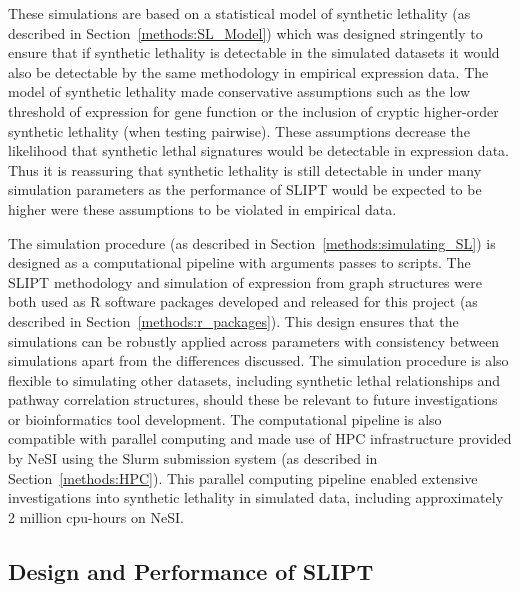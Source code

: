 These simulations are based on a statistical model of synthetic lethality (as described in Section~\ref{methods:SL_Model}) which was designed stringently to ensure that if synthetic lethality is detectable in the simulated datasets it would also be detectable by the same methodology in empirical expression data. The model of synthetic lethality made conservative assumptions such as the low threshold of expression for gene function or the inclusion of cryptic higher-order synthetic lethality (when testing pairwise). These assumptions decrease the likelihood that synthetic lethal signatures would be detectable in expression data. Thus it is reassuring that synthetic lethality is still detectable in under many simulation parameters as the performance of \gls{SLIPT} would be expected to be higher were these assumptions to be violated in empirical data.


The simulation procedure (as described in Section~\ref{methods:simulating_SL}) is designed as a computational pipeline with arguments passes to scripts. The \gls{SLIPT} methodology and simulation of expression from graph structures were both used as R \citep{R_core} software packages developed and released for this project (as described in Section~\ref{methods:r_packages}). This design ensures that the simulations can be robustly applied across parameters with consistency between simulations apart from the differences discussed. The simulation procedure is also flexible to simulating other datasets, including synthetic lethal relationships and pathway correlation structures, should these be relevant to future investigations or bioinformatics tool development. The computational pipeline is also compatible with parallel computing and made use of \gls{HPC} infrastructure provided by \gls{NeSI} using the \gls{Slurm} submission system (as described in Section~\ref{methods:HPC}). This parallel computing pipeline enabled extensive investigations into synthetic lethality in simulated data, including approximately 2 million cpu-hours on \gls{NeSI}. 


\subsection{Design and Performance of SLIPT}

